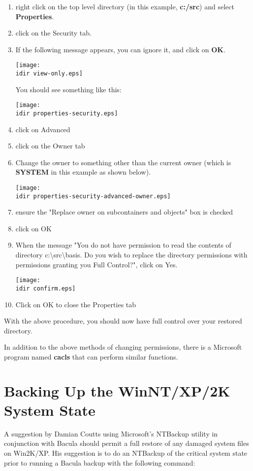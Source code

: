 \begin{enumerate}
\item right click on the top level directory (in this example, {\bf c:/src})
   and  select {\bf Properties}. 
\item click on the Security tab. 
\item If the following message appears, you can ignore it, and click on {\bf
   OK}. 

\texttt{[image: \\idir view-only.eps]} 

You should see something like this: 

\texttt{[image: \\idir properties-security.eps]} 
\item click on Advanced 
\item click on the Owner tab 
\item Change the owner to something other than the current owner (which is
   {\bf SYSTEM} in this example as shown below). 

\texttt{[image: \\idir properties-security-advanced-owner.eps]} 
\item ensure the "Replace owner on subcontainers and objects" box is 
   checked 
\item click on OK 
\item When the message "You do not have permission to read the contents of
   directory c:\textbackslash{}src\textbackslash{}basis. Do you wish to replace
   the directory permissions with permissions granting you Full Control?", click
on Yes. 

\texttt{[image: \\idir confirm.eps]} 
\item Click on OK to close the Properties tab 
   \end{enumerate}

With the above procedure, you should now have full control over your restored
directory. 

In addition to the above methods of changing permissions, there is a Microsoft
program named {\bf cacls} that can perform similar functions.

\section{Backing Up the WinNT/XP/2K System State}

A suggestion by Damian Coutts using Microsoft's NTBackup utility in
conjunction with Bacula should permit a full restore of any damaged system
files on Win2K/XP. His suggestion is to do an NTBackup of the critical system
state prior to running a Bacula backup with the following command: 


